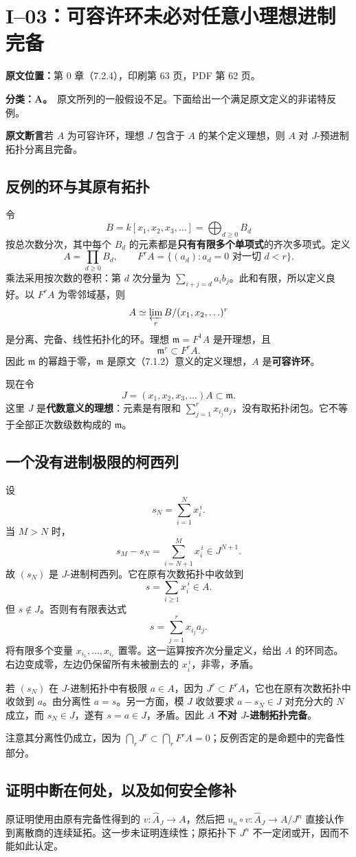 \documentclass[UTF8,a4paper]{ctexbook}
\newcommand{\oldauditsrc}[1]{\par\noindent\textbf{原文位置：}#1。\par}
\newcommand{\kind}[2]{\noindent\textbf{分类：#1。}\ #2\par}
\newcommand{\lead}[1]{\par\noindent\textbf{#1}\quad}
\begin{document}
\section{I--03：可容许环未必对任意小理想进制完备}
\oldauditsrc{第 0 章（7.2.4），印刷第 63 页，PDF 第 62 页}
\kind{A}{原文所列的一般假设不足。下面给出一个满足原文定义的非诺特反例。}
\lead{原文断言}若 $A$ 为可容许环，理想 $J$ 包含于 $A$ 的某个定义理想，则 $A$ 对 $J$-预进制拓扑分离且完备。
\subsection*{反例的环与其原有拓扑}
令
\[
B=k[x_1,x_2,x_3,\ldots]=\bigoplus_{d\ge0}B_d
\]
按总次数分次，其中每个 $B_d$ 的元素都是\textbf{只有有限多个单项式}的齐次多项式。定义
\[
A=\prod_{d\ge0}B_d,
\qquad F^rA=\{(a_d):a_d=0\text{ 对一切 }d<r\}.
\]
乘法采用按次数的卷积：第 $d$ 次分量为 $\sum_{i+j=d}a_i b_j$。此和有限，所以定义良好。以 $F^rA$ 为零邻域基，则
\[
A\simeq\varprojlim_r B/(x_1,x_2,\ldots)^r
\]
是分离、完备、线性拓扑化的环。理想 $\mathfrak m=F^1A$ 是开理想，且
\[
\mathfrak m^r\subset F^rA.
\]
因此 $\mathfrak m$ 的幂趋于零，$\mathfrak m$ 是原文（7.1.2）意义的定义理想，$A$ 是\textbf{可容许环}。

现在令
\[
J=(x_1,x_2,x_3,\ldots)A\subset\mathfrak m.
\]
这里 $J$ 是\textbf{代数意义的理想}：元素是有限和 $\sum_{j=1}^{r}x_{i_j}a_j$，没有取拓扑闭包。它不等于全部正次数级数构成的 $\mathfrak m$。
\subsection*{一个没有进制极限的柯西列}
设
\[
s_N=\sum_{i=1}^{N}x_i^{\,i}.
\]
当 $M>N$ 时，
\[
s_M-s_N=\sum_{i=N+1}^{M}x_i^{\,i}\in J^{N+1}.
\]
故 $(s_N)$ 是 $J$-进制柯西列。它在原有次数拓扑中收敛到
\[
s=\sum_{i\ge1}x_i^{\,i}\in A.
\]
但 $s\notin J$。否则有有限表达式
\[
s=\sum_{j=1}^{r}x_{i_j}a_j.
\]
将有限多个变量 $x_{i_1},\ldots,x_{i_r}$ 置零。这一运算按齐次分量定义，给出 $A$ 的环同态。右边变成零，左边仍保留所有未被删去的 $x_i^{\,i}$，非零，矛盾。

若 $(s_N)$ 在 $J$-进制拓扑中有极限 $a\in A$，因为 $J^r\subset F^rA$，它也在原有次数拓扑中收敛到 $a$。由分离性 $a=s$。另一方面，模 $J$ 收敛要求 $a-s_N\in J$ 对充分大的 $N$ 成立，而 $s_N\in J$，遂有 $s=a\in J$，矛盾。因此 $A$ \textbf{不对 $J$-进制拓扑完备}。

注意其分离性仍成立，因为 $\bigcap_rJ^r\subset\bigcap_rF^rA=0$；反例否定的是命题中的完备性部分。
\subsection*{证明中断在何处，以及如何安全修补}
原证明使用由原有完备性得到的 $v:\widehat A_J\to A$，然后把 $u_n\circ v:\widehat A_J\to A/J^n$ 直接认作到离散商的连续延拓。这一步未证明连续性；原拓扑下 $J^n$ 不一定闭或开，因而不能如此认定。
\end{document}
